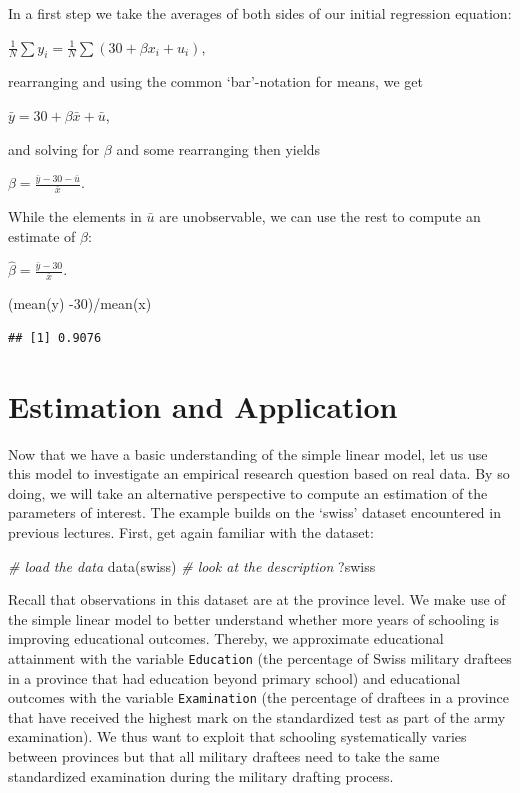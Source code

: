 \documentclass[
  12pt,
]{style/krantz}
\newenvironment{Shaded}{\begin{snugshade}}{\end{snugshade}}
\newcommand{\CommentTok}[1]{\textcolor[rgb]{0.56,0.35,0.01}{\textit{#1}}}
\newcommand{\DecValTok}[1]{\textcolor[rgb]{0.00,0.00,0.81}{#1}}
\newcommand{\FunctionTok}[1]{\textcolor[rgb]{0.00,0.00,0.00}{#1}}
\newcommand{\NormalTok}[1]{#1}
\newcommand{\SpecialCharTok}[1]{\textcolor[rgb]{0.00,0.00,0.00}{#1}}
\begin{document}
In a first step we take the averages of both sides of our initial regression equation:

\(\frac{1}{N}\sum{y_i}=\frac{1}{N}\sum{(30 + \beta x_{i} + u_{i})}\),

rearranging and using the common `bar'-notation for means, we get

\(\bar{y}=30+\beta\bar{x} + \bar{u}\),

and solving for \(\beta\) and some rearranging then yields

\(\beta=\frac{\bar{y}-30-\bar{u}}{\bar{x}}\).

While the elements in \(\bar{u}\) are unobservable, we can use the rest to compute an estimate of \(\beta\):

\(\hat{\beta}=\frac{\bar{y}-30}{\bar{x}}\).

\begin{Shaded}
\begin{Highlighting}[]
\NormalTok{(}\FunctionTok{mean}\NormalTok{(y) }\SpecialCharTok{{-}}\DecValTok{30}\NormalTok{)}\SpecialCharTok{/}\FunctionTok{mean}\NormalTok{(x)}
\end{Highlighting}
\end{Shaded}

\begin{verbatim}
## [1] 0.9076
\end{verbatim}

\hypertarget{estimation-and-application}{%
\section{Estimation and Application}\label{estimation-and-application}}

Now that we have a basic understanding of the simple linear model, let us use this model to investigate an empirical research question based on real data. By so doing, we will take an alternative perspective to compute an estimation of the parameters of interest. The example builds on the `swiss' dataset encountered in previous lectures. First, get again familiar with the dataset:

\begin{Shaded}
\begin{Highlighting}[]
\CommentTok{\# load the data}
\FunctionTok{data}\NormalTok{(swiss)}
\CommentTok{\# look at the description}
\NormalTok{?swiss}
\end{Highlighting}
\end{Shaded}

Recall that observations in this dataset are at the province level. We make use of the simple linear model to better understand whether more years of schooling is improving educational outcomes. Thereby, we approximate educational attainment with the variable \texttt{Education} (the percentage of Swiss military draftees in a province that had education beyond primary school) and educational outcomes with the variable \texttt{Examination} (the percentage of draftees in a province that have received the highest mark on the standardized test as part of the army examination). We thus want to exploit that schooling systematically varies between provinces but that all military draftees need to take the same standardized examination during the military drafting process.
\end{document}
